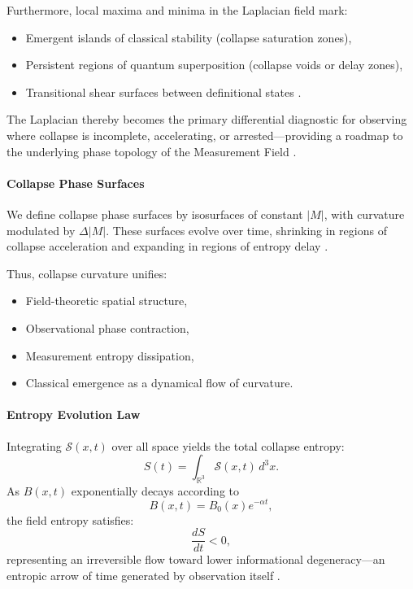 Furthermore, local maxima and minima in the Laplacian field mark:
\begin{itemize}
    \item Emergent islands of classical stability (collapse saturation zones),
    \item Persistent regions of quantum superposition (collapse voids or delay zones),
    \item Transitional shear surfaces between definitional states \cite{gisin_epistemology_2014, donadi_nonmarkovian_2021}.
\end{itemize}

The Laplacian thereby becomes the primary differential diagnostic for observing where collapse is incomplete, accelerating, or arrested---providing a roadmap to the underlying phase topology of the Measurement Field \cite{zurek_decoherence,penrose_gravity_1996}.

\paragraph{Collapse Phase Surfaces}
We define collapse phase surfaces by isosurfaces of constant $|M|$, with curvature modulated by $\Delta |M|$. These surfaces evolve over time, shrinking in regions of collapse acceleration and expanding in regions of entropy delay \cite{vonNeumann1932mathQM, penrose_diosi_model}.

Thus, collapse curvature unifies:
\begin{itemize}
    \item Field-theoretic spatial structure,
    \item Observational phase contraction,
    \item Measurement entropy dissipation,
    \item Classical emergence as a dynamical flow of curvature. \cite{zurek_decoherence, bassi_models_2013}
\end{itemize}

\paragraph{Entropy Evolution Law}
Integrating $\mathcal{S}(x,t)$ over all space yields the total collapse entropy:
\[
S(t) = \int_{\mathbb{R}^3} \mathcal{S}(x,t) \, d^3x.
\]
As $B(x,t)$ exponentially decays according to
\[
B(x,t) = B_0(x) e^{-\alpha t},
\]
the field entropy satisfies:
\[
\frac{dS}{dt} < 0,
\]
representing an irreversible flow toward lower informational degeneracy---an entropic arrow of time generated by observation itself \cite{bassi_models_2013, tumulka_epistemology_2007}.


